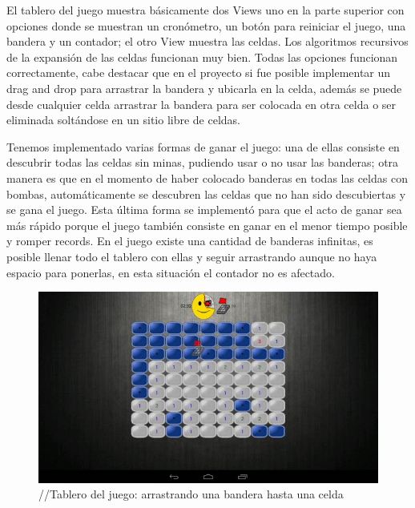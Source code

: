 \documentclass[11pt]{article} %
\begin{document}
El tablero del juego muestra básicamente dos Views uno en la parte superior con opciones donde se muestran un cronómetro, un botón para reiniciar el juego, una bandera y un contador; el otro View muestra las celdas.  Los algoritmos recursivos de la expansión de las celdas funcionan muy bien. Todas las opciones  funcionan correctamente, cabe destacar que en el proyecto si fue posible implementar un drag and drop para arrastrar la bandera y ubicarla en la celda, además se puede desde cualquier celda arrastrar la bandera para ser colocada en otra celda o ser eliminada soltándose en un sitio libre de celdas. 

Tenemos implementado varias formas de ganar el juego: una de ellas consiste en descubrir todas las celdas sin minas, pudiendo usar o no usar las banderas; otra manera es que en el momento de haber colocado banderas en todas las celdas con bombas, automáticamente se descubren las celdas que no han sido descubiertas y se gana el juego. Esta última forma se implementó para que el acto de ganar sea más rápido porque el juego también consiste en ganar en el menor tiempo posible y romper records. En el juego existe una cantidad de banderas infinitas, es posible llenar todo el tablero con ellas y seguir arrastrando aunque no haya espacio para ponerlas, en esta situación el contador no es afectado.

\begin{figure}[H]
 \begin{center}
    \includegraphics{imagenes_Documentacion/fig2}
\end{center}
\caption {//Tablero del juego: arrastrando una bandera hasta una celda}
\label{Figura 2}
\end{figure}
\end{document}
